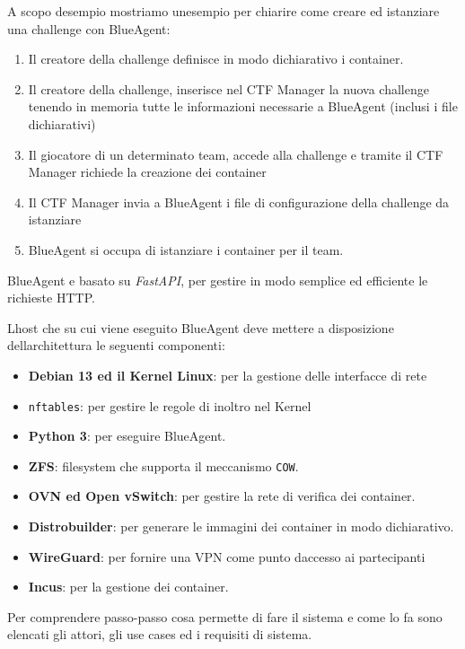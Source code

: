 A scopo d\textquotesingle esempio mostriamo un\textquotesingle esempio
per chiarire come creare ed istanziare una challenge con BlueAgent:

\begin{enumerate}
\def\labelenumi{\arabic{enumi}.}
\tightlist
\item
  Il creatore della challenge definisce in modo dichiarativo i
  container.
\item
  Il creatore della challenge, inserisce nel CTF Manager la nuova
  challenge tenendo in memoria tutte le informazioni necessarie a
  BlueAgent (inclusi i file dichiarativi)
\item
  Il giocatore di un determinato team, accede alla challenge e tramite
  il CTF Manager richiede la creazione dei container
\item
  Il CTF Manager invia a BlueAgent i file di configurazione della
  challenge da istanziare
\item
  BlueAgent si occupa di istanziare i container per il team.
\end{enumerate}

BlueAgent e\textquotesingle{} basato su \emph{FastAPI}, per gestire in
modo semplice ed efficiente le richieste HTTP.

L\textquotesingle host che su cui viene eseguito BlueAgent deve mettere
a disposizione dell\textquotesingle architettura le seguenti componenti:

\begin{itemize}
\tightlist
\item
  \textbf{Debian 13 ed il Kernel Linux}: per la gestione delle
  interfacce di rete
\item
  \passthrough{\lstinline!nftables!}: per gestire le regole di inoltro
  nel Kernel
\item
  \textbf{Python 3}: per eseguire BlueAgent.
\item
  \textbf{ZFS}: filesystem che supporta il meccanismo
  \passthrough{\lstinline!COW!}.
\item
  \textbf{OVN ed Open vSwitch}: per gestire la rete di verifica dei
  container.
\item
  \textbf{Distrobuilder}: per generare le immagini dei container in modo
  dichiarativo.
\item
  \textbf{WireGuard}: per fornire una VPN come punto
  d\textquotesingle accesso ai partecipanti
\item
  \textbf{Incus}: per la gestione dei container.
\end{itemize}

Per comprendere passo-passo cosa permette di fare il sistema e come lo
fa sono elencati gli attori, gli use cases ed i requisiti di sistema.
